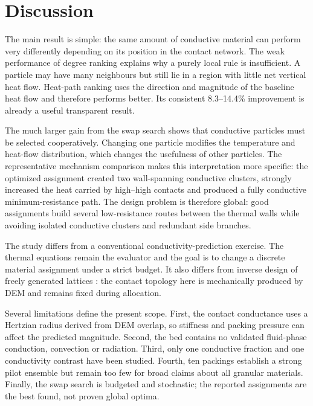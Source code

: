 \documentclass[12pt,a4paper]{article}
\begin{document}
	\section{Discussion}
	
	The main result is simple: the same amount of conductive material can perform
	very differently depending on its position in the contact network. The weak
	performance of degree ranking explains why a purely local rule is insufficient.
	A particle may have many neighbours but still lie in a region with little net
	vertical heat flow. Heat-path ranking uses the direction and magnitude of the
	baseline heat flow and therefore performs better. Its consistent 8.3--14.4\%
	improvement is already a useful transparent result.
	
	The much larger gain from the swap search shows that conductive particles must
	be selected cooperatively. Changing one particle modifies the temperature and
	heat-flow distribution, which changes the usefulness of other particles. The
	representative mechanism comparison makes this interpretation more specific:
	the optimized assignment created two wall-spanning conductive clusters,
	strongly increased the heat carried by high--high contacts and produced a fully
	conductive minimum-resistance path. The design problem is therefore global:
	good assignments build several low-resistance routes between the thermal walls
	while avoiding isolated conductive clusters and redundant side branches.
	
	The study differs from a conventional conductivity-prediction exercise. The
	thermal equations remain the evaluator and the goal is to change a discrete
	material assignment under a strict budget. It also differs from inverse design
	of freely generated lattices \cite{Dold2023}: the contact topology here is
	mechanically produced by DEM and remains fixed during allocation.
	
	Several limitations define the present scope. First, the contact conductance
	uses a Hertzian radius derived from DEM overlap, so stiffness and packing
	pressure can affect the predicted magnitude. Second, the bed contains no
	validated fluid-phase conduction, convection or radiation. Third, only one
	conductive fraction and one conductivity contrast have been studied. Fourth,
	ten packings establish a strong pilot ensemble but remain too few for broad
	claims about all granular materials. Finally, the swap search is budgeted and
	stochastic; the reported assignments are the best found, not proven global
	optima.
	
\end{document}

